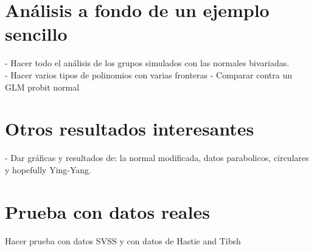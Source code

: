 \documentclass[../Main/Main.tex]{subfiles}
\begin{document}
\section{Análisis a fondo de un ejemplo sencillo}
- Hacer todo el análisis de los grupos simulados con las normales bivariadas. \\
- Hacer varios tipos de polinomios con varias fronteras
- Comparar contra un GLM probit normal

\section{Otros resultados interesantes}
- Dar gráficas y resultados de: la normal modificada, datos parabolicos, circulares y hopefully Ying-Yang.

\section{Prueba con datos reales}
Hacer prueba con datos SVSS y con datos de Hastie and Tibsh
\end{document}

